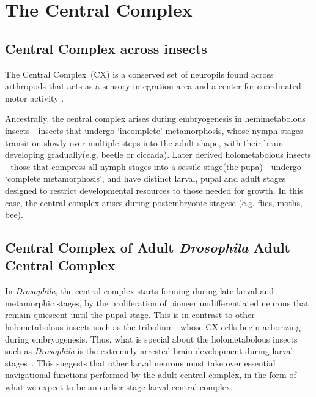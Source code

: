 \section{The Central Complex}

    \subsection{Central Complex across insects}
    
        The Central Complex~(CX) is a conserved set of neuropils found across arthropods that acts as a sensory integration area and a center for coordinated motor activity \citep{PfeifferHomberg2014, turnerevans2016CX, heinze2024variations}.
        

        Ancestrally, the central complex arises during embryogenesis in hemimetabolous insects - insects that undergo ‘incomplete’ metamorphosis, whose nymph stages transition slowly over multiple steps into the adult shape, with their brain developing gradually(e.g. beetle or ciccada).
        Later derived holometabolous insects - those that compress all nymph stages into a sessile stage(the pupa) -  undergo ‘complete metamorphosis’, and have distinct larval, pupal and adult stages designed to restrict developmental resources to those needed for growth. In this case, the central complex arises during  postembryonic stagese (e.g. flies, moths, bee).

    \subsection{Central Complex of Adult \textit{Drosophila} Adult Central Complex}
        In \textit{Drosophila}, the central complex starts forming during late larval and metamorphic stages, by the proliferation of pioneer undifferentiated neurons that remain quiescent until the pupal stage. This is in contrast to other holometabolous insects such as the tribolium~\citep{farnworth2022atlas} whose CX cells begin arborizing during embryogenesis. Thus, what is special about the holometabolous insects such as \textit{Drosophila} is the extremely arrested brain development during larval stages~\citep{andrade2019developmentally}. This suggests that other larval neurons must take over essential navigational functions performed by the adult central complex, in the form of what we expect to be an earlier stage larval central complex. 

